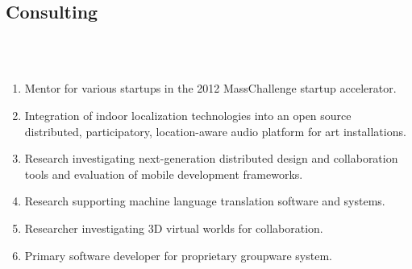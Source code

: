 \documentclass[line]{res}
\begin{document}
\begin{resume}
	\section{\sc Consulting}
	\begin{format}
		\\
		\body\\
	\end{format}
	\begin{enumerate}

		\item	{}
		\begin{position}
			Mentor for various startups in the 2012 MassChallenge startup accelerator.
		\end{position}
		
		\item {}
		\begin{position}
			Integration of indoor localization technologies into an open source distributed, participatory, location-aware audio platform for art installations.
		\end{position}
		
		\item {}
		\begin{position}
			Research investigating next-generation distributed design and collaboration tools and evaluation of mobile development frameworks.
		\end{position}
		
		\item {} 
		\begin{position}
			Research supporting machine language translation software and systems. 
		\end{position}
		
		\item {} 
		\begin{position}
			Researcher investigating 3D virtual worlds for collaboration. 
		\end{position}
		
		\item {} 
		\begin{position}
			Primary software developer for proprietary groupware system. 
		\end{position}
		

\end{enumerate}
\end{resume}
\end{document}
